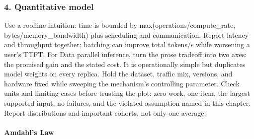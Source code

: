 \subsubsection*{4. Quantitative model}
Use a roofline intuition: time is bounded by max(operations/compute\_rate, bytes/memory\_bandwidth) plus scheduling and communication. Report latency and throughput together; batching can improve total tokens/s while worsening a user's TTFT.
For Data parallel inference, turn the prose tradeoff into two axes: the promised gain and the stated cost. It is operationally simple but duplicates model weights on every replica. Hold the dataset, traffic mix, versions, and hardware fixed while sweeping the mechanism's controlling parameter.
Check units and limiting cases before trusting the plot: zero work, one item, the largest supported input, no failures, and the violated assumption named in this chapter. Report distributions and important cohorts, not only one average.
\paragraph{Amdahl's Law}

